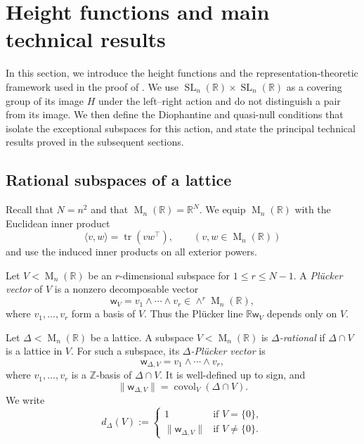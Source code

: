 \documentclass[reqno,11pt]{amsart}
\numberwithin{equation}{section}
\theoremstyle{definition}
\theoremstyle{remark}
\newcommand{\op}{\operatorname}
\newcommand{\br}{\mathbb R}
\newcommand{\M}{\op{M}}
\newcommand{\SL}{\op{SL}}
\begin{document}
\section{Height functions and main technical results}
\label{s:height-main}

In this section, we introduce the height functions and the representation-theoretic
framework used in the proof of . We use
$\SL_n(\mathbb R)\times\SL_n(\mathbb R)$ as a covering group of its image $H$ under the
left--right action and do not distinguish a pair from its image. We then define the Diophantine and quasi-null conditions
that isolate the exceptional subspaces for this action, and state the
principal technical results proved in the subsequent sections.

\subsection{Rational subspaces of a lattice}
Recall that $N=n^2$ and that $\M_n(\mathbb R)=\mathbb R^N$.
 We equip $\M_n(\mathbb R)$ with the
Euclidean inner product
$$
\langle v,w\rangle=\operatorname{tr}(v w^{\intercal}),\qquad(v, w\in \M_n(\br))
$$
 and use the induced inner
products on all exterior powers.

Let $V<\M_n(\mathbb R)$ be an $r$-dimensional subspace for $1\leq r\leq N-1$. A
\emph{Pl\"ucker vector} of $V$ is a nonzero decomposable vector
\begin{equation}\label{wvv}
\mathsf w_V=v_1\wedge\cdots\wedge v_r
\in \wedge^r\M_n(\mathbb R),
\end{equation}
where $v_1,\ldots,v_r$ form a basis of $V$. Thus the Pl\"ucker line
$\mathbb R\mathsf w_V$ depends only on $V$.

Let $\Delta<\M_n(\mathbb R)$ be a lattice. A subspace
$V<\M_n(\mathbb R)$ is \emph{$\Delta$-rational} if $\Delta\cap V$ is a
lattice in $V$. For such a subspace, its \emph{$\Delta$-Pl\"ucker vector}
is
\begin{equation}\label{wv}
\mathsf w_{\Delta,V}=v_1\wedge\cdots\wedge v_r,
\end{equation}
where $v_1,\ldots,v_r$ is a $\mathbb Z$-basis of $\Delta\cap V$. It is well-defined up to sign, and
$$
\|\mathsf w_{\Delta,V}\|=\operatorname{covol}_V(\Delta\cap V).
$$
We write
$$
d_\Delta(V):=
\begin{cases}
1 &\text{if } V=\{0\},\\
\|\mathsf w_{\Delta,V}\|& \text{if }V\neq\{0\}.
\end{cases}
$$
\end{document}
